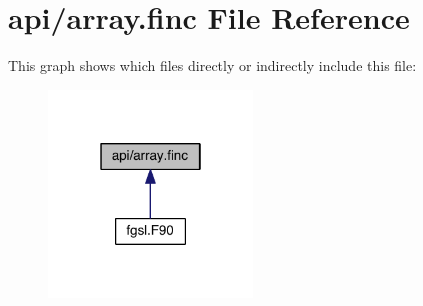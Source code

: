 \hypertarget{array_8finc}{\section{api/array.finc File Reference}
\label{array_8finc}
}
This graph shows which files directly or indirectly include this file\-:
\nopagebreak
\begin{figure}[H]
\begin{center}
\leavevmode
\includegraphics[width=154pt]{array_8finc__dep__incl}
\end{center}
\end{figure}
